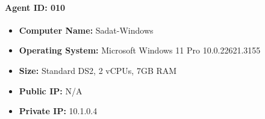 \paragraph*{Agent ID: 010}
\begin{itemize}
    \item \textbf{Computer Name:} Sadat-Windows
    \item \textbf{Operating System:} Microsoft Windows 11 Pro 10.0.22621.3155
    \item \textbf{Size:} Standard DS2, 2 vCPUs, 7GB RAM
    \item \textbf{Public IP:} N/A
    \item \textbf{Private IP:} 10.1.0.4
\end{itemize}



